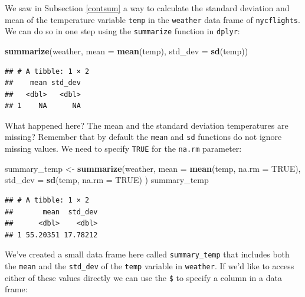 \documentclass[]{tufte-book}
\newenvironment{Shaded}{\begin{snugshade}}{\end{snugshade}}
\newcommand{\KeywordTok}[1]{\textcolor[rgb]{0.13,0.29,0.53}{\textbf{{#1}}}}
\newcommand{\DataTypeTok}[1]{\textcolor[rgb]{0.13,0.29,0.53}{{#1}}}
\newcommand{\StringTok}[1]{\textcolor[rgb]{0.31,0.60,0.02}{{#1}}}
\newcommand{\OtherTok}[1]{\textcolor[rgb]{0.56,0.35,0.01}{{#1}}}
\newcommand{\NormalTok}[1]{{#1}}
\begin{document}
We saw in Subsection \ref{contsum} a way to calculate the standard
deviation and mean of the temperature variable \texttt{temp} in the
\texttt{weather} data frame of \texttt{nycflights}. We can do so in one
step using the \texttt{summarize} function in \texttt{dplyr}:

\begin{Shaded}
\begin{Highlighting}[]
\KeywordTok{summarize}\NormalTok{(weather,}
          \DataTypeTok{mean =} \KeywordTok{mean}\NormalTok{(temp),}
          \DataTypeTok{std_dev =} \KeywordTok{sd}\NormalTok{(temp))}
\end{Highlighting}
\end{Shaded}

\begin{verbatim}
## # A tibble: 1 × 2
##    mean std_dev
##   <dbl>   <dbl>
## 1    NA      NA
\end{verbatim}

What happened here? The mean and the standard deviation temperatures are
missing? Remember that by default the \texttt{mean} and \texttt{sd}
functions do not ignore missing values. We need to specify \texttt{TRUE}
for the \texttt{na.rm} parameter:

\begin{Shaded}
\begin{Highlighting}[]
\NormalTok{summary_temp <-}\StringTok{ }\KeywordTok{summarize}\NormalTok{(weather,}
          \DataTypeTok{mean =} \KeywordTok{mean}\NormalTok{(temp, }\DataTypeTok{na.rm =} \OtherTok{TRUE}\NormalTok{),}
          \DataTypeTok{std_dev =} \KeywordTok{sd}\NormalTok{(temp, }\DataTypeTok{na.rm =} \OtherTok{TRUE}\NormalTok{)}
          \NormalTok{)}
\NormalTok{summary_temp}
\end{Highlighting}
\end{Shaded}

\begin{verbatim}
## # A tibble: 1 × 2
##       mean  std_dev
##      <dbl>    <dbl>
## 1 55.20351 17.78212
\end{verbatim}

We've created a small data frame here called \texttt{summary\_temp} that
includes both the \texttt{mean} and the \texttt{std\_dev} of the
\texttt{temp} variable in \texttt{weather}. If we'd like to access
either of these values directly we can use the \texttt{\$} to specify a
column in a data frame:

\begin{Shaded}
\end{Shaded}
\end{document}

